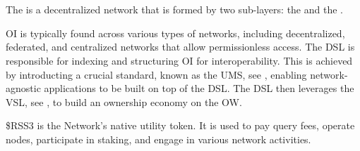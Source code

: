 \section{}

The  is a decentralized network that is formed by two sub-layers: the  and the .

\gls{OI} is typically found across various types of networks, including decentralized, federated, and centralized networks that allow permissionless access.
The \gls{DSL} is responsible for indexing and structuring \gls{OI} for interoperability.
This is achieved by introducting a crucial standard, known as the \gls{UMS}, see , enabling network-agnostic applications to be built on top of the \gls{DSL}.
The \gls{DSL} then leverages the \gls{VSL}, see , to build an ownership economy on the \gls{OW}.

\$RSS3 is the Network's native utility token. It is used to pay query fees, operate nodes, participate in staking, and engage in various network activities.